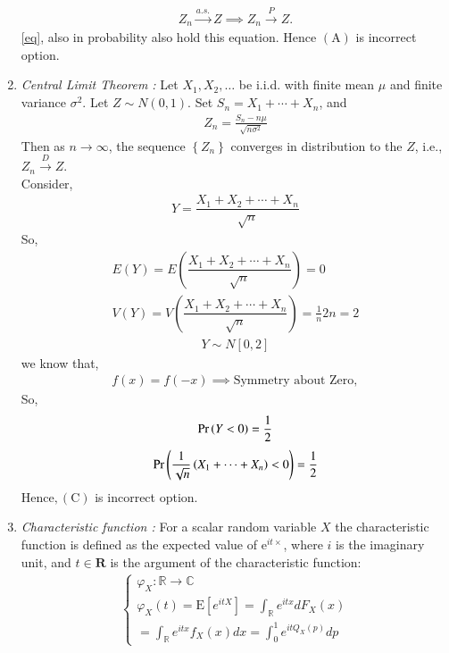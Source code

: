 \documentclass[journal,12pt,twocolumn]{IEEEtran}
\begin{document}
\begin{enumerate}[label=\alph*)]
\begin{align}
 Z_n \stackrel{a.s.}{\rightarrow} Z \implies Z_n \stackrel{P}{\rightarrow} Z.
\end{align}
\eqref{eq}, also in probability also hold this equation. Hence $(\mathrm{A})$ is incorrect option.  
\item 
{\em Central Limit Theorem : }Let $X_{1}, X_{2}, \ldots$ be i.i.d. with finite mean $\mu$ and finite variance $\sigma^{2}$. Let $Z \sim N(0,1) .$ Set $S_{n}=X_{1}+\cdots+X_{n}$, and
\begin{align}
Z_{n}=\frac{S_{n}-n \mu}{\sqrt{n \sigma^{2}}}
\end{align}
Then as $n \rightarrow \infty$, the sequence $\left\{Z_{n}\right\}$ converges in distribution to the $Z$, i.e., $Z_{n} \stackrel{D}{\rightarrow} Z$.\\
Consider,
\begin{align}
Y=\dfrac{X_{1}+ X_{2}+ \cdots + X_n}{\sqrt{n}}
\end{align}
So,
\begin{align}
E(Y)= E\left(\dfrac{X_{1}+ X_{2}+ \cdots+X_n}{\sqrt{n}}\right)= 0\\
V(Y)= V\left(\dfrac{X_{1}+ X_{2}+ \cdots+X_n}{\sqrt{n}}\right)= \frac{1}{n}2n=2
\end{align}
\begin{align}
Y \sim N[0,2]
\end{align}
we know that,
\begin{align}
f(x)=f(-x)\implies \text{Symmetry about Zero},
\end{align}
So,
\begin{align}
\Pr\left(Y<0\right)=\frac{1}{2}
\end{align}
\begin{align}
\Pr\left(\dfrac{1}{\sqrt{n}}\left(X_{1}+\cdots+X_{n}\right)<0\right)=\frac{1}{2}
\end{align}
Hence$,(\mathrm{C})$ is incorrect option.
\item {\em Characteristic function : }For a scalar random variable $X$ the characteristic function is defined as the expected value of $\mathrm{e}^{i t \times}$, where $i$ is the imaginary unit, and $t \in \mathbf{R}$ is the argument of the characteristic function:
\begin{align}
\left\{\begin{array}{l}
\varphi_{X}: \mathbb{R} \rightarrow \mathbb{C} \\
\varphi_{X}(t)=\mathrm{E}\left[e^{i t X}\right]=\int_{\mathbb{R}} e^{i t x} d F_{X}(x)\\=\int_{\mathbb{R}} e^{i t x} f_{X}(x) d x=\int_{0}^{1} e^{i t Q_{X}(p)} d p

\end{array}
\end{align}
\end{enumerate}
\end{document}
